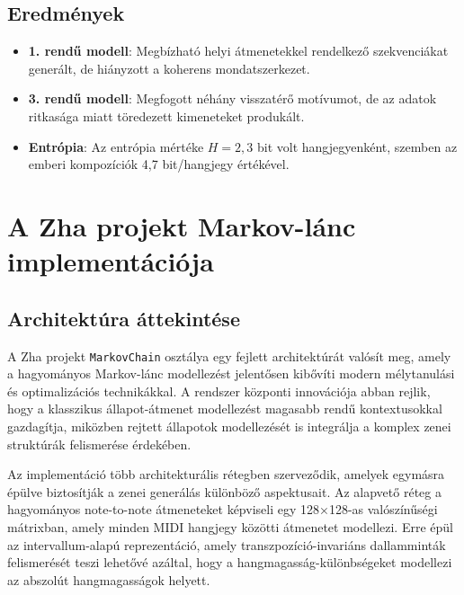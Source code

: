 \subsection{Eredmények}

\begin{itemize}
    \item \textbf{1. rendű modell}: Megbízható helyi átmenetekkel rendelkező szekvenciákat generált, de hiányzott a koherens mondatszerkezet.
    \item \textbf{3. rendű modell}: Megfogott néhány visszatérő motívumot, de az adatok ritkasága miatt töredezett kimeneteket produkált.
    \item \textbf{Entrópia}: Az entrópia mértéke \( H = 2,3 \) bit volt hangjegyenként, szemben az emberi kompozíciók 4,7 bit/hangjegy értékével.
\end{itemize}


\section{A Zha projekt Markov-lánc implementációja}

\subsection{Architektúra áttekintése}

A Zha projekt \texttt{MarkovChain} osztálya egy fejlett architektúrát valósít meg, amely a hagyományos Markov-lánc modellezést jelentősen kibővíti modern mélytanulási és optimalizációs technikákkal. A rendszer központi innovációja abban rejlik, hogy a klasszikus állapot-átmenet modellezést magasabb rendű kontextusokkal gazdagítja, miközben rejtett állapotok modellezését is integrálja a komplex zenei struktúrák felismerése érdekében.

Az implementáció több architekturális rétegben szerveződik, amelyek egymásra épülve biztosítják a zenei generálás különböző aspektusait. Az alapvető réteg a hagyományos note-to-note átmeneteket képviseli egy 128×128-as valószínűségi mátrixban, amely minden MIDI hangjegy közötti átmenetet modellezi. Erre épül az intervallum-alapú reprezentáció, amely transzpozíció-invariáns dallamminták felismerését teszi lehetővé azáltal, hogy a hangmagasság-különbségeket modellezi az abszolút hangmagasságok helyett.

